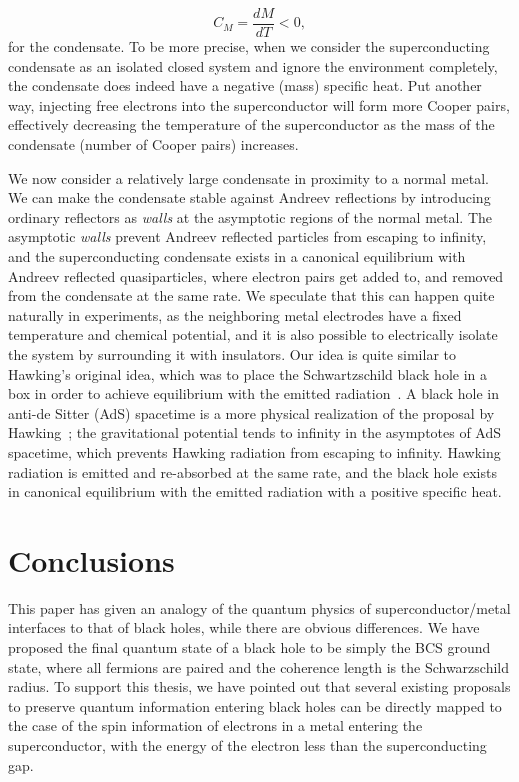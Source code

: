 \documentclass[12pt,letterpaper,aps,onecolumn,superscriptaddress,floatfix,notitlepage]{revtex4-1}
\begin{document}
	\begin{equation}
	C_{M} = \frac{dM}{dT}<0,
	\end{equation}
	for the condensate. To be more precise, when we consider the superconducting condensate as an isolated closed system and ignore the environment completely, the condensate does indeed have a negative (mass) specific heat. Put another way, injecting free electrons into the superconductor will form more Cooper pairs, effectively decreasing the temperature of the superconductor as the mass of the condensate (number of Cooper pairs) increases. 
	
	We now consider a relatively large condensate in proximity to a normal metal. We can make the condensate stable against Andreev reflections by introducing  ordinary reflectors as \textit{walls} at the asymptotic regions of the normal metal. The asymptotic \textit{walls} prevent Andreev reflected particles from escaping to infinity, and the superconducting condensate exists in a canonical equilibrium with Andreev reflected quasiparticles, where electron pairs get added to, and removed from the condensate at the same rate. We speculate that this can happen quite naturally in experiments, as the neighboring metal electrodes have a fixed temperature and chemical potential, and it is also possible to electrically isolate the system by surrounding it with insulators. Our idea is quite similar to Hawking's original idea, which was to place the Schwartzschild black hole in a box in order to achieve equilibrium with the emitted radiation~\cite{hawking1976black}. A black hole in anti-de Sitter (AdS) spacetime is a more physical realization of the proposal by Hawking~\cite{AdS}; the gravitational potential tends to infinity in the asymptotes of AdS spacetime, which prevents Hawking radiation from escaping to infinity. Hawking radiation is emitted and re-absorbed at the same rate, and the black hole exists in canonical equilibrium with the emitted radiation with a  positive specific heat.     
	\section{Conclusions}
	This paper has given an analogy of the quantum physics of superconductor/metal interfaces to that of black holes, while there are obvious differences.  We have proposed the final quantum state of a black hole to be simply the BCS ground state, where all fermions are paired and the coherence length is the Schwarzschild radius.  To support this thesis, we have pointed out that several existing proposals to preserve quantum information entering black holes can be directly mapped to the case of the spin information of electrons in a metal entering the superconductor, with the energy of the electron less than the superconducting gap.  
	
\end{document}
